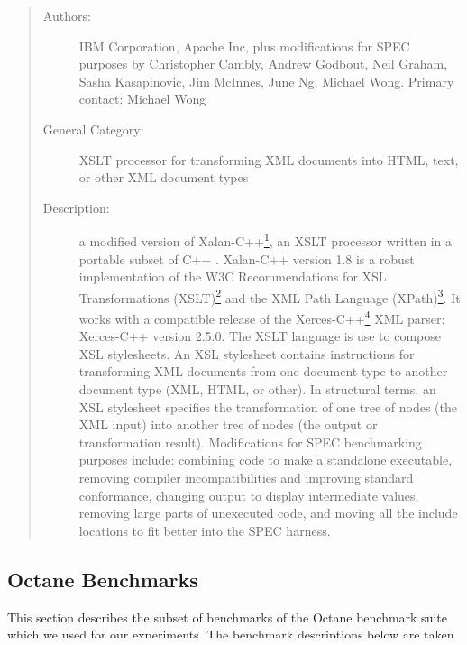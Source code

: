 \documentclass[onecolumn, openright, master, english, signatures]{dbrgrptt}
\begin{document}
\begin{quote}
\begin{description}
\item[Authors:] IBM Corporation, Apache Inc, plus modifications for SPEC purposes by Christopher Cambly, Andrew Godbout, Neil Graham, Sasha Kasapinovic, Jim McInnes, June Ng, Michael Wong. Primary contact: Michael Wong

\item[General Category:] XSLT processor for transforming XML documents into HTML, text, or other XML document types

\item[Description:] a modified version of Xalan-C++\footnote{\url{http://xml.apache.org/xalan-c/}}, an XSLT processor written in a portable subset of C++ . Xalan-C++ version 1.8 is a robust implementation of the W3C Recommendations for XSL Transformations (XSLT)\footnote{\url{http://www.w3.org/TR/xslt}} and the XML Path Language (XPath)\footnote{\url{http://www.w3.org/TR/xpath}}. It works with a compatible release of the Xerces-C++\footnote{\url{http://xml.apache.org/xerces-c}} XML parser: Xerces-C++ version 2.5.0. The XSLT language is use to compose XSL stylesheets. An XSL stylesheet contains instructions for transforming XML documents from one document type to another document type (XML, HTML, or other). In structural terms, an XSL stylesheet specifies the transformation of one tree of nodes (the XML input) into another tree of nodes (the output or transformation result).
Modifications for SPEC benchmarking purposes include: combining code to make a standalone executable, removing compiler incompatibilities and improving standard conformance, changing output to display intermediate values, removing large parts of unexecuted code, and moving all the include locations to fit better into the SPEC harness.
\end{description}
\end{quote}

\subsection{Octane Benchmarks}

This section describes the subset of benchmarks of the Octane benchmark suite \cite{v8benchmarks} which we used for our experiments. The benchmark descriptions below are taken from the Octane website.

\subsubsection{Richards}
\end{document}

